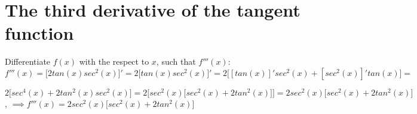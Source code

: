 \documentclass[10pt,a4paper]{article}
\begin{document}
\section{The third derivative of the tangent function}
Differentiate $f(x)$ with the respect to $x$, such that $f'''(x)$: \\

$f'''(x) = \big[ 2 tan(x) sec^{2}(x) \big]' = 
2 \big[tan(x) sec^{2}(x) \big]' = 
2 \big[[tan(x)]'sec^{2}(x) + [sec^{2}(x)]'tan(x) \big] =$

$2 \big[ sec^4(x) + 2 tan^{2}(x) sec^{2}(x) \big] =
2 \Big[ sec^{2}(x) \big[ sec^{2}(x) + 2 tan^{2}(x) \big] \Big] = 
2 sec^{2}(x) \big[ sec^{2}(x) + 2 tan^{2}(x) \big]$, $\implies f'''(x) = 2 sec^{2}(x) \big[ sec^{2}(x) + 2 tan^{2}(x) \big]$
\end{document}
